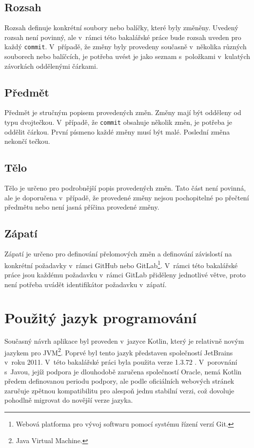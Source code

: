     \subsection{Rozsah}
        Rozsah definuje konkrétní soubory nebo balíčky, které byly změněny. Uvedený rozsah není povinný, ale v~rámci této bakalářské práce bude rozsah uveden pro každý \verb|commit|. V~případě, že změny byly provedeny současně v~několika různých souborech nebo balíčcích, je potřeba uvést je jako seznam s~položkami v~kulatých závorkách oddělenými čárkami.
    
    \subsection{Předmět}
        Předmět je stručným popisem provedených změn. Změny mají být odděleny od typu dvojtečkou. V~případě, že \verb|commit| obsahuje několik změn, je potřeba je oddělit čárkou. První písmeno každé změny musí být malé. Poslední změna nekončí tečkou.
    
    \subsection{Tělo}
        Tělo je určeno pro podrobnější popis provedených změn. Tato část není povinná, ale je doporučena v~případě, že provedené změny nejsou pochopitelné po přečtení předmětu nebo není jasná příčina provedené změny.
    
    \subsection{Zápatí}
        Zápatí je určeno pro definování přelomových změn a definování závislostí na konkrétní požadavky v~rámci GitHub nebo GitLab\footnote{Webová platforma pro vývoj softwaru pomocí systému řízení verzí Git.}. V~rámci této bakalářské práce jsou každému požadavku v~rámci GitLab přiděleny jednotlivé větve, proto není potřeba uvádět identifikátor požadavku v~zápatí.
    
\section{Použitý jazyk programování}\label{resere:kotlin}
    Současný návrh aplikace byl proveden v~jazyce Kotlin, který je relativně novým jazykem pro JVM\footnote{Java Virtual Machine.}. Poprvé byl tento jazyk představen společností JetBrains v~roku 2011. V~této bakalářské práci byla použita verze 1.3.72 . V~porovnání s~Javou, jejíž podpora je dlouhodobě zaručena společností Oracle, nemá Kotlin předem definovanou periodu podpory, ale podle oficiálních webových stránek zaručuje zpětnou kompatibilitu pro alespoň jednu stabilní verzi, což dovoluje pohodlně migrovat do novější verze jazyka.\cite{java-support-period}\cite{kotlin-compatibility}
    
